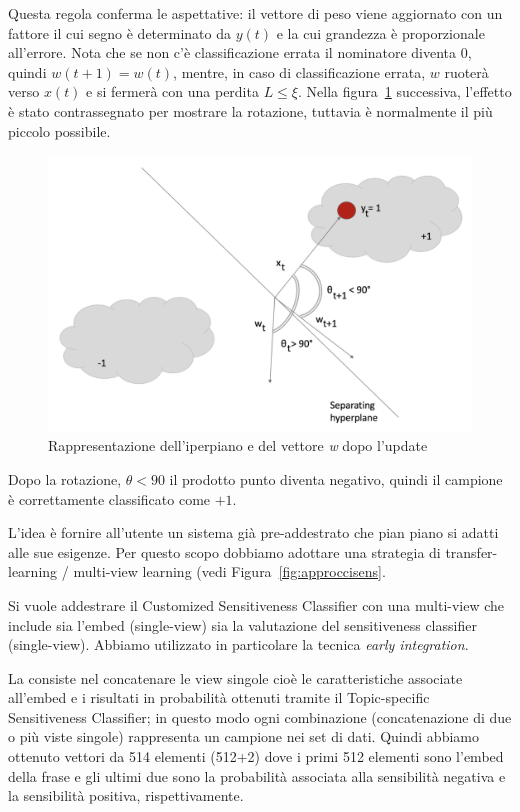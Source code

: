 Questa regola conferma le aspettative: il vettore di peso viene aggiornato con un fattore il cui segno è determinato da $y(t)$ e la cui grandezza è proporzionale all'errore. Nota che se non c'è classificazione errata il nominatore diventa $0$, quindi $w(t + 1) = w(t)$, mentre, in caso di classificazione errata, $w$ ruoterà verso $x(t)$ e si fermerà con una perdita $L \leq \xi$. Nella figura~\ref{fig:PAII2} successiva, l'effetto è stato contrassegnato per mostrare la rotazione, tuttavia è normalmente il più piccolo possibile.

\begin{figure}[h]
    \centering
    \includegraphics[scale=0.5]{Figure/PAII2.png}
    \caption{Rappresentazione dell'iperpiano e del vettore \textit{w} dopo l'update}
    \label{fig:PAII2}
\end{figure}
\FloatBarrier  


Dopo la rotazione, $\theta <90$ il prodotto punto diventa negativo, quindi il campione è correttamente classificato come $+1$.

L'idea è fornire all'utente un sistema già pre-addestrato che pian piano si adatti alle sue esigenze. Per questo scopo dobbiamo adottare una strategia di transfer-learning / multi-view learning\cite{transfer-learning} (vedi Figura~\ref{fig:approccisens}.

Si vuole addestrare il Customized Sensitiveness Classifier con una multi-view che include sia l'embed (single-view) sia la valutazione del sensitiveness classifier (single-view). Abbiamo utilizzato in particolare la tecnica \textit{early integration}. 

La  consiste nel concatenare le view singole cioè le caratteristiche associate all'embed e i risultati in probabilità ottenuti tramite il Topic-specific Sensitiveness Classifier; in questo modo ogni combinazione (concatenazione di due o più viste singole) rappresenta un campione nei set di dati. Quindi abbiamo ottenuto vettori da 514 elementi (512+2) dove i primi 512 elementi sono l'embed della frase e gli ultimi due sono la probabilità associata alla sensibilità negativa e la sensibilità positiva, rispettivamente.


